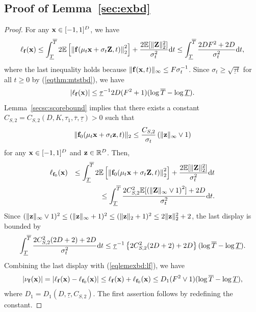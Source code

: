 \documentclass[twoside,11pt]{article}
\newcommand{\bff}{{\bf f}}
\newcommand{\bx}{{\bf x}}
\newcommand{\bz}{{\bf z}}
\newcommand{\bZ}{{\bf Z}}
\newcommand{\bbE}{{\mathbb E}}
\newcommand{\bbR}{{\mathbb R}}
\newcommand{\be}{\begin{equation}}
\newcommand{\ee}{\end{equation}}
\newcommand{\bean}{\setlength\arraycolsep{1pt}\begin{eqnarray*}}
\newcommand{\eean}{\end{eqnarray*}}
\def\d{{\rm d}}
\begin{document}
\subsection{ Proof of Lemma~\ref{sec:exbd} }
\begin{proof}
For any $\bx \in [-1,1]^{D}$, we have
\bean
\ell_{\bff}(\bx) \leq \int_{\underline{T}}^{\overline{T}} 2 \bbE \left[ \left\| \bff(\mu_t \bx + \sigma_t \bZ, t) \right\|_2^2\right] + \frac{2 \bbE[ \|\bZ\|_2^2 ]}{\sigma_t^2} \d t
\leq \int_{\underline{T}}^{\overline{T}} \frac{2DF^2 + 2D}{\sigma_t^2} \d t,
\eean
where the last inequality holds because $\| \bff(\bx,t) \|_{\infty} \leq F \sigma_{t}^{-1}$.
Since $\sigma_t \geq \sqrt{\underline{\tau} t }$ for all $t \geq 0$ by (\ref{eqthm:mtstbd}), we have
\be
\vert \ell_{\bff}(\bx) \vert \leq \underline{\tau}^{-1} 2D(F^2 + 1) ( \log \overline{T} - \log \underline{T}).  \label{eqlemexbd:lf}
\ee
Lemma~\ref{secsc:scorebound} implies that there exists a constant $C_{S,2} = C_{S,2}(D, K,\tau_1, \overline{\tau}, \underline{\tau}) > 0 $ such that 
\bean
\| \bff_0(\mu_t \bx + \sigma_t \bz,t) \|_2 \leq \frac{C_{S,2}}{\sigma_t} \left( \|\bz\|_{\infty} \vee 1 \right)
\eean
for any $\bx \in [-1,1]^{D}$ and $\bz \in \bbR^{D}$. 
Then,
\bean
\ell_{\bff_0} (\bx) && \leq \int_{\underline{T}}^{\overline{T}} 2 \bbE \left[ \left\| \bff_0(\mu_t \bx + \sigma_t \bZ, t) \right\|_2^2\right] + \frac{2 \bbE[ \|\bZ\|_2^2 ]}{\sigma_t^2} \d t
\\
&& \leq \int_{\underline{T}}^{\overline{T}} \frac{2 C_{S,2}^2  \bbE[ \left( \| \bZ\|_{\infty} \vee 1 \right)^2  ] +  2D }{\sigma_t^2} \d t.
\eean
Since $(\| \bz \|_{\infty} \vee 1)^2 \leq (\| \bz \|_{\infty} + 1)^2 \leq (\| \bz \|_2 + 1)^2 \leq 2 \| \bz \|_2^2 + 2$, the last display is bounded by
\bean
\int_{\underline{T}}^{\overline{T}} \frac{2 C_{S,2}^2  (2D + 2)  +  2D }{\sigma_t^2} \d t \leq \underline{\tau}^{-1} \left\{ 2 C_{S,2}^2  (2D + 2)  +  2D \right\} ( \log \overline{T} - \log \underline{T}).
\eean
Combining the last display with (\ref{eqlemexbd:lf}), we have
\bean
\vert \nu_{\bff}(\bx) \vert = \vert \ell_{\bff}(\bx) - \ell_{\bff_0}(\bx) \vert \leq \ell_{\bff}(\bx) + \ell_{\bff_0}(\bx) \leq D_{1} (F^2 \vee 1) (\log \overline{T} - \log \underline{T}),
\eean
where $D_{1} = D_{1}(D, \underline{\tau}, C_{S,2})$. The first assertion follows by redefining the constant.


\end{proof}
\end{document}
